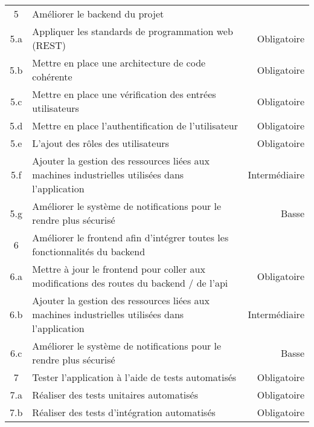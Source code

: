 \documentclass[
    iai, %
    il, %
]{heig-tb}
\begin{document}
\begin{table}[h]
\begin{center}
\begin{tabular}{c|l|r}
            5   & Améliorer le backend du projet                                                                                         &               \\
            5.a & Appliquer les standards de programmation web (REST)                                                                    & Obligatoire   \\
            5.b & Mettre en place une architecture de code cohérente                                                                     & Obligatoire   \\
            5.c & Mettre en place une vérification des entrées utilisateurs                                                              & Obligatoire   \\
            5.d & Mettre en place l'authentification de l'utilisateur                                                                    & Obligatoire   \\
            5.e & L'ajout des rôles des utilisateurs                                                                                     & Obligatoire   \\
            5.f & Ajouter la gestion des ressources liées aux machines industrielles utilisées dans l'application                        & Intermédiaire \\
            5.g & Améliorer le système de notifications pour le rendre plus sécurisé                                                     & Basse         \\
            6   & Améliorer le frontend afin d'intégrer toutes les fonctionnalités du backend                                            &               \\
            6.a & Mettre à jour le frontend pour coller aux modifications des routes du backend / de l'api                               & Obligatoire   \\
            6.b & Ajouter la gestion des ressources liées aux machines industrielles utilisées dans l'application                        & Intermédiaire \\
            6.c & Améliorer le système de notifications pour le rendre plus sécurisé                                                     & Basse         \\
            7   & Tester l'application à l'aide de tests automatisés                                                                     & Obligatoire   \\
            7.a & Réaliser des tests unitaires automatisés                                                                               & Obligatoire   \\
            7.b & Réaliser des tests d'intégration automatisés                                                                           & Obligatoire   \\
        \end{tabular}
    \end{center}
\end{table}
\end{document}
